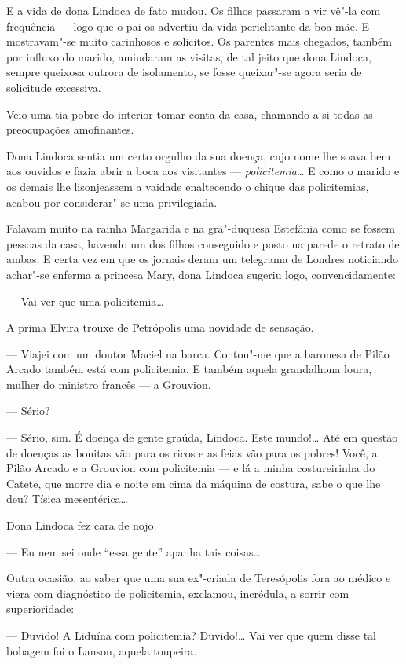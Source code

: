 E a vida de dona Lindoca de fato mudou. Os filhos passaram a vir vê"-la
com frequência --- logo que o pai os advertiu da vida periclitante da
boa mãe. E mostravam"-se muito carinhosos e solícitos. Os parentes mais
chegados, também por influxo do marido, amiudaram as visitas, de tal
jeito que dona Lindoca, sempre queixosa outrora de isolamento, se fosse
queixar"-se agora seria de solicitude excessiva.

Veio uma tia pobre do interior tomar conta da casa, chamando a si todas
as preocupações amofinantes.

Dona Lindoca sentia um certo orgulho da sua doença, cujo nome lhe soava
bem aos ouvidos e fazia abrir a boca aos visitantes ---
\emph{policitemia}\ldots{} E como o marido e os demais lhe lisonjeassem a
vaidade enaltecendo o chique das policitemias, acabou por considerar"-se
uma privilegiada.

Falavam muito na rainha Margarida e na grã"-duquesa Estefânia como se
fossem pessoas da casa, havendo um dos filhos conseguido e posto na
parede o retrato de ambas. E certa vez em que os jornais deram um
telegrama de Londres noticiando achar"-se enferma a princesa Mary, dona
Lindoca sugeriu logo, convencidamente:

--- Vai ver que uma policitemia\ldots{}

A prima Elvira trouxe de Petrópolis uma novidade de sensação.

--- Viajei com um doutor Maciel na barca. Contou"-me que a baronesa de
Pilão Arcado também está com policitemia. E também aquela grandalhona
loura, mulher do ministro francês --- a Grouvion.

--- Sério?

--- Sério, sim. É doença de gente graúda, Lindoca. Este mundo!\ldots{} Até em
questão de doenças as bonitas vão para os ricos e as feias vão para os
pobres! Você, a Pilão Arcado e a Grouvion com policitemia --- e lá a
minha costureirinha do Catete, que morre dia e noite em cima da máquina
de costura, sabe o que lhe deu? Tísica mesentérica\ldots{}

Dona Lindoca fez cara de nojo.

--- Eu nem sei onde ``essa gente'' apanha tais coisas\ldots{}

Outra ocasião, ao saber que uma sua ex"-criada de Teresópolis fora ao
médico e viera com diagnóstico de policitemia, exclamou, incrédula, a
sorrir com superioridade:

--- Duvido! A Liduína com policitemia? Duvido!\ldots{} Vai ver que quem disse
tal bobagem foi o Lanson, aquela toupeira.

